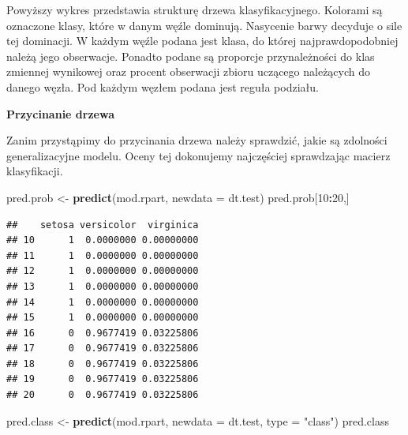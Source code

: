 \documentclass[
]{book}
\newenvironment{Shaded}{\begin{snugshade}}{\end{snugshade}}
\newcommand{\AttributeTok}[1]{\textcolor[rgb]{0.13,0.29,0.53}{#1}}
\newcommand{\DecValTok}[1]{\textcolor[rgb]{0.00,0.00,0.81}{#1}}
\newcommand{\FunctionTok}[1]{\textcolor[rgb]{0.13,0.29,0.53}{\textbf{#1}}}
\newcommand{\NormalTok}[1]{#1}
\newcommand{\OtherTok}[1]{\textcolor[rgb]{0.56,0.35,0.01}{#1}}
\newcommand{\SpecialCharTok}[1]{\textcolor[rgb]{0.81,0.36,0.00}{\textbf{#1}}}
\newcommand{\StringTok}[1]{\textcolor[rgb]{0.31,0.60,0.02}{#1}}
\theoremstyle{plain}
\theoremstyle{definition}
\theoremstyle{definition}
\theoremstyle{definition}
\theoremstyle{definition}
\theoremstyle{definition}
\theoremstyle{remark}
\begin{document}
Powyższy wykres przedstawia strukturę drzewa klasyfikacyjnego. Kolorami są oznaczone klasy, które w danym węźle dominują. Nasycenie barwy decyduje o sile tej dominacji. W każdym węźle podana jest klasa, do której najprawdopodobniej należą jego obserwacje. Ponadto podane są proporcje przynależności do klas zmiennej wynikowej oraz procent obserwacji zbioru uczącego należących do danego węzła. Pod każdym węzłem podana jest reguła podziału.

\textbf{Przycinanie drzewa}

Zanim przystąpimy do przycinania drzewa należy sprawdzić, jakie są zdolności generalizacyjne modelu. Oceny tej dokonujemy najczęściej sprawdzając macierz klasyfikacji.

\begin{Shaded}
\begin{Highlighting}[]
\NormalTok{pred.prob }\OtherTok{\textless{}{-}} \FunctionTok{predict}\NormalTok{(mod.rpart, }
                     \AttributeTok{newdata =}\NormalTok{ dt.test)}
\NormalTok{pred.prob[}\DecValTok{10}\SpecialCharTok{:}\DecValTok{20}\NormalTok{,]}
\end{Highlighting}
\end{Shaded}

\begin{verbatim}
##    setosa versicolor  virginica
## 10      1  0.0000000 0.00000000
## 11      1  0.0000000 0.00000000
## 12      1  0.0000000 0.00000000
## 13      1  0.0000000 0.00000000
## 14      1  0.0000000 0.00000000
## 15      1  0.0000000 0.00000000
## 16      0  0.9677419 0.03225806
## 17      0  0.9677419 0.03225806
## 18      0  0.9677419 0.03225806
## 19      0  0.9677419 0.03225806
## 20      0  0.9677419 0.03225806
\end{verbatim}

\begin{Shaded}
\begin{Highlighting}[]
\NormalTok{pred.class }\OtherTok{\textless{}{-}} \FunctionTok{predict}\NormalTok{(mod.rpart, }
                      \AttributeTok{newdata =}\NormalTok{ dt.test,}
                      \AttributeTok{type =} \StringTok{"class"}\NormalTok{)}
\NormalTok{pred.class}
\end{Highlighting}
\end{Shaded}
\end{document}
